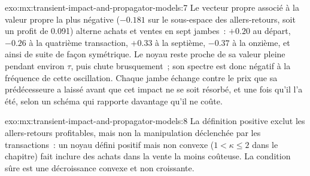 \begin{solution}{exo:mx:transient-impact-and-propagator-models:7}
Le vecteur propre associé à la valeur propre la plus négative ($-0.181$ sur le sous-espace des allers-retours, soit un profit de 0.091) alterne achats et ventes en sept jambes~: $+0.20$
au départ, $-0.26$ à la quatrième transaction, $+0.33$ à la septième, $-0.37$ à la onzième, et ainsi de suite de façon symétrique. Le noyau reste proche de sa valeur pleine
pendant environ $\tau$, puis chute brusquement~; son spectre est donc négatif à la fréquence de cette oscillation. Chaque jambe échange contre le prix que
sa prédécesseure a laissé avant que cet impact ne se soit résorbé, et une fois qu'il l'a été, selon un schéma qui rapporte davantage qu'il ne coûte.
\end{solution}

\begin{solution}{exo:mx:transient-impact-and-propagator-models:8}
La définition positive exclut les allers-retours profitables, mais non la manipulation déclenchée par les transactions~: un noyau défini positif mais non convexe
($1<\kappa\le2$ dans le chapitre) fait inclure des achats dans la vente la moins coûteuse. La condition sûre est une décroissance convexe et non croissante.
\end{solution}

